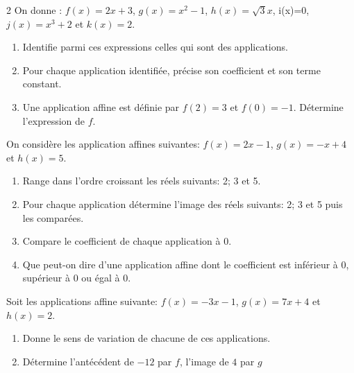 \begin{multicols*}{2}
 	On donne : $ f(x)=2x+3 $, $ g(x)=x^2-1 $, $ h(x)=\sqrt{3}x $, i(x)=0, $ j(x)=x^3+2 $ et $ k(x)=2 $.
 	\begin{enumerate}
 		\item Identifie parmi ces expressions celles qui sont des applications.
 		\item Pour chaque application identifiée, précise son coefficient et son terme constant.
 		\item Une application affine est définie par $ f(2)=3 $ et $ f(0)=-1 $. Détermine l'expression de $ f $.
 	\end{enumerate}
 	\dures
 	On considère les application affines suivantes: $ f(x)=2x-1 $, $ g(x)=-x+4 $ et $ h(x)=5 $.
 	\begin{enumerate}
 		\item Range dans l'ordre croissant les réels suivants: 2; 3 et 5.
 		\item Pour chaque application détermine l'image des réels suivants: 2; 3 et 5 puis les comparées.
 		\item Compare le coefficient de chaque application à 0.
 		\item Que peut-on dire d'une application affine dont le coefficient est inférieur à 0, supérieur à 0 ou égal à 0.
 	\end{enumerate}
 	\dures
 	 
 	Soit les applications affine suivante: $ f(x)=-3x-1 $, $ g(x)=7x+4 $ et $ h(x)=2$.
 	\begin{enumerate}
 		\item Donne le sens de variation de chacune de ces applications.
 		\item Détermine l'antécédent de $-12$ par $f$, l'image de $4$ par $ g $
 	\end{enumerate}
 	\dures
 	

\end{multicols*}
